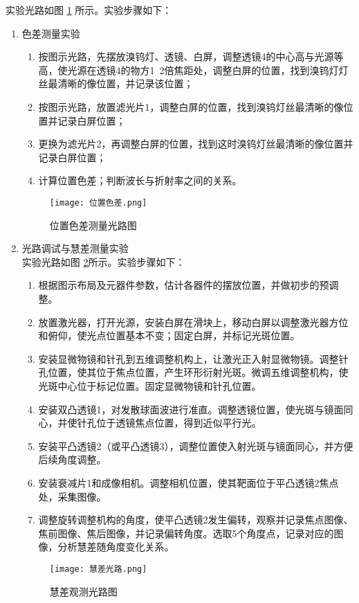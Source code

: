 \documentclass[dvipsnames, svgnames,a4paper,11pt]{article}
\begin{document}
	
	实验光路如图 \ref{位置色差} 所示。实验步骤如下：
	\begin{enumerate}
\item 色差测量实验

	\begin{enumerate}
		\item 按图示光路，先摆放溴钨灯、透镜、白屏，调整透镜4的中心高与光源等高，使光源在透镜4的物方1~2倍焦距处，调整白屏的位置，找到溴钨灯灯丝最清晰的像位置，并记录该位置；
		\item 按图示光路，放置滤光片1，调整白屏的位置，找到溴钨灯丝最清晰的像位置并记录白屏位置；
		\item 更换为滤光片2，再调整白屏的位置，找到这时溴钨灯丝最清晰的像位置并记录白屏位置；
		\item 计算位置色差；判断波长与折射率之间的关系。
	\end{enumerate}
	\begin{figure}[H]
		\centering
		\texttt{[image: 位置色差.png]}
		\caption{位置色差测量光路图}
		\label{位置色差}
	\end{figure}
	\item 光路调试与慧差测量实验\\
	实验光路如图 \ref{慧差}所示。实验步骤如下：
	\begin{enumerate}
		\item 根据图示布局及元器件参数，估计各器件的摆放位置，并做初步的预调整。
		\item 放置激光器，打开光源，安装白屏在滑块上，移动白屏以调整激光器方位和俯仰，使光点位置基本不变；固定白屏，并标记光斑位置。
		\item 安装显微物镜和针孔到五维调整机构上，让激光正入射显微物镜。调整针孔位置，使其位于焦点位置，产生环形衍射光斑。微调五维调整机构，使光斑中心位于标记位置。固定显微物镜和针孔位置。
		\item 安装双凸透镜1，对发散球面波进行准直。调整透镜位置，使光斑与镜面同心，并使针孔位于透镜焦点位置，得到近似平行光。
		\item 安装平凸透镜2（或平凸透镜3），调整位置使入射光斑与镜面同心，并方便后续角度调整。
		\item 安装衰减片1和成像相机。调整相机位置，使其靶面位于平凸透镜2焦点处，采集图像。
		\item 调整旋转调整机构的角度，使平凸透镜2发生偏转，观察并记录焦点图像、焦前图像、焦后图像，并记录偏转角度。选取5个角度点，记录对应的图像，分析慧差随角度变化关系。
	\end{enumerate}
	\begin{figure}[H]
		\centering
		\texttt{[image: 慧差光路.png]}
		\caption{慧差观测光路图}
		\label{慧差}
	\end{figure}
\end{enumerate}
\end{document}
